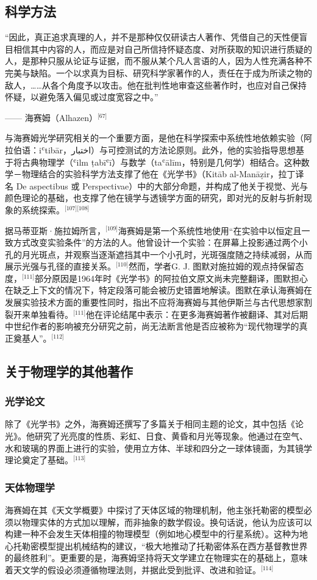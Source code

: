 \subsection{科学方法}
“因此，真正追求真理的人，并不是那种仅仅研读古人著作、凭借自己的天性便盲目相信其中内容的人，而应是对自己所信持怀疑态度、对所获取的知识进行质疑的人，是那种只服从论证与证据，而不服从某个凡人言语的人，因为人性充满各种不完美与缺陷。一个以求真为目标、研究科学家著作的人，责任在于成为所读之物的敌人，……从各个角度予以攻击。他在批判性地审查这些著作时，也应对自己保持怀疑，以避免落入偏见或过度宽容之中。”

—— 海赛姆（Alhazen）\(^\text{[67]}\)

与海赛姆光学研究相关的一个重要方面，是他在科学探索中系统性地依赖实验（阿拉伯语：iʿtibār，اختبار）与可控测试的方法论原则。此外，他的实验指导思想基于将古典物理学（ʿilm ṭabīʿī）与数学（taʿālīm，特别是几何学）相结合。这种数学－物理结合的实验科学方法支撑了他在《光学书》（Kitāb al-Manāẓir，拉丁译名 De aspectibus 或 Perspectivae）中的大部分命题，并构成了他关于视觉、光与颜色理论的基础，也支撑了他在镜学与透镜学方面的研究，即对光的反射与折射现象的系统探索。\(^\text{[107][108]}\)

据马蒂亚斯·施拉姆所言，\(^\text{[109]}\)海赛姆是第一个系统性地使用“在实验中以恒定且一致方式改变实验条件”的方法的人。他曾设计一个实验：在屏幕上投影通过两个小孔的月光斑点，并观察当逐渐遮挡其中一个小孔时，光斑强度随之持续减弱，从而展示光强与孔径的直接关系。\(^\text{[110]}\)然而，学者G. J. 图默对施拉姆的观点持保留态度，\(^\text{[111]}\)部分原因是1964年时《光学书》的阿拉伯文原文尚未完整翻译，图默担心在缺乏上下文的情况下，特定段落可能会被历史错置地解读。图默在承认海赛姆在发展实验技术方面的重要性同时，指出不应将海赛姆与其他伊斯兰与古代思想家割裂开来单独看待。\(^\text{[111]}\)他在评论结尾中表示：在更多海赛姆著作被翻译、其对后期中世纪作者的影响被充分研究之前，尚无法断言他是否应被称为“现代物理学的真正奠基人”。\(^\text{[112]}\)
\subsection{关于物理学的其他著作}
\subsubsection{光学论文}
除了《光学书》之外，海赛姆还撰写了多篇关于相同主题的论文，其中包括《论光》。他研究了光亮度的性质、彩虹、日食、黄昏和月光等现象。他通过在空气、水和玻璃的界面上进行的实验，使用立方体、半球和四分之一球体镜面，为其镜学理论奠定了基础。\(^\text{[113]}\)
\subsubsection{天体物理学}
海赛姆在其《天文学概要》中探讨了天体区域的物理机制，他主张托勒密的模型必须以物理实体的方式加以理解，而非抽象的数学假设。换句话说，他认为应该可以构建一种不会发生天体相撞的物理模型（例如地心模型中的行星系统）。这种为地心托勒密模型提出机械结构的建议，“极大地推动了托勒密体系在西方基督教世界的最终胜利”。更重要的是，海赛姆坚持将天文学建立在物理实在的基础上，意味着天文学的假设必须遵循物理法则，并据此受到批评、改进和验证。\(^\text{[114]}\)

